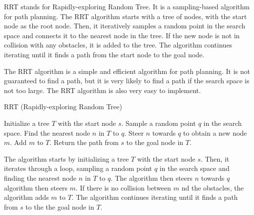 RRT stands for Rapidly-exploring Random Tree. It is a sampling-based algorithm for path planning. The RRT algorithm starts with a tree of nodes, with the start node as the root node. Then, it iteratively samples a random point in the search space and connects it to the nearest node in the tree. If the new node is not in collision with any obstacles, it is added to the tree. The algorithm continues iterating until it finds a path from the start node to the goal node.

The RRT algorithm is a simple and efficient algorithm for path planning. It is not guaranteed to find a path, but it is very likely to find a path if the search space is not too large. The RRT algorithm is also very easy to implement.


\begin{algorithm}
    \caption{RRT (Rapidly-exploring Random Tree)}
    \begin{algorithmic}
        \STATE Initialize a tree $T$ with the start node $s$.
        \STATE Sample a random point $q$ in the search space.
        \STATE Find the nearest node $n$ in $T$ to $q$.
        \STATE Steer $n$ towards $q$ to obtain a new node $m$.
        \STATE Add $m$ to $T$.
        \ENDIF
        \ENDFOR
        \STATE Return the path from $s$ to the goal node in $T$.
    \end{algorithmic}
\end{algorithm}

The algorithm starts by initializing a tree $T$ with the start node $s$. Then, it iterates through a loop, sampling a random point $q$ in the search space and finding the nearest node $n$ in $T$ to $q$. The algorithm then steers $n$ towards $q$ algorithm then steers $m$. If there is no collision between $m$ nd the obstacles, the algorithm adds $m$ to $T$. The algorithm continues iterating until it finds a path from $s$ to the the goal node in $T$.




